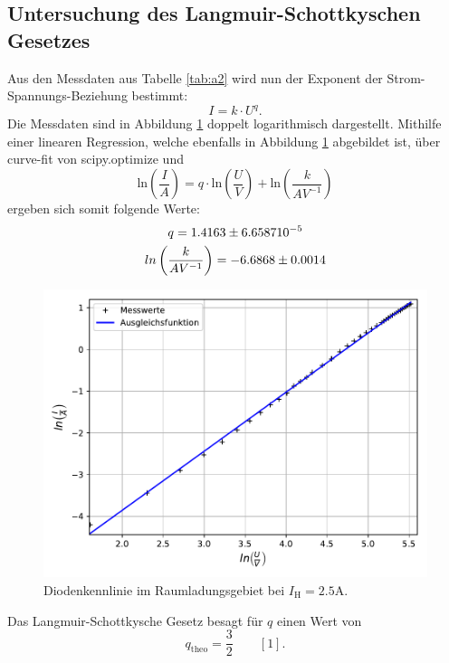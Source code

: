 \subsection{Untersuchung des Langmuir-Schottkyschen Gesetzes}
Aus den Messdaten aus Tabelle \ref{tab:a2} wird nun der Exponent der Strom-Spannungs-Beziehung bestimmt:
\begin{equation}
\label{Strom-Spannung}
	I = k \cdot U^{q}.
\end{equation}
Die Messdaten sind in Abbildung \ref{fig:b} doppelt logarithmisch dargestellt.
Mithilfe einer linearen Regression, welche ebenfalls in Abbildung \ref{fig:b} abgebildet ist, über curve-fit  von scipy.optimize und 
\begin{equation*}
	\text{ln}\left(\frac{I}{A}\right) = q \cdot \text{ln} \left(\frac{U}{V}\right) + \text{ln}\left(\frac{k}{A V^{-1}}\right)
\end{equation*}
ergeben sich somit folgende Werte:
\begin{gather*}
	q = \num{1.4163 \pm 6.6587}{10^{-5}} \\
	ln\left(\frac{k}{A V^{-1}}\right) = \num{-6.6868 \pm 0.0014}
\end{gather*}
\begin{figure}[H]
    \centering
    \includegraphics[scale=0.7]{Auswertung/b.pdf}
    \caption{Diodenkennlinie im Raumladungsgebiet bei $I_\text{H} = 2.5 \text{A}$.}
    \label{fig:b}
\end{figure}

Das Langmuir-Schottkysche Gesetz besagt für $q$ einen Wert von
\begin{equation*}
	q_{\text{theo}} = \frac{3}{2} \qquad [1].
\end{equation*}

